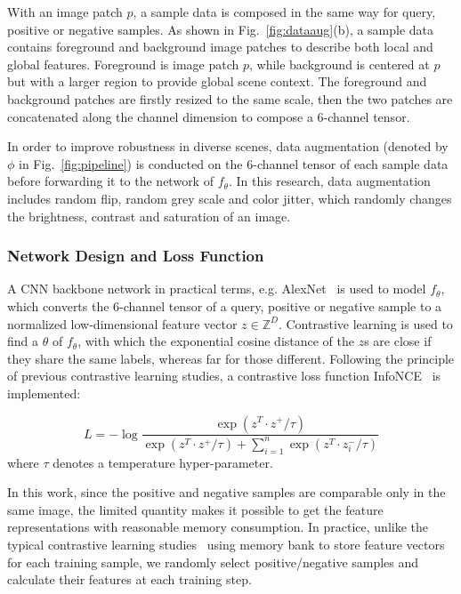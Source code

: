 \documentclass[letterpaper, 10 pt, conference]{ieeeconf}  %
\begin{document}
With an image patch $p$, a sample data is composed in the same way for query, positive or negative samples.
As shown in Fig.~\ref{fig:dataaug}(b), a sample data contains foreground and background image patches to describe both local and global features. Foreground is image patch $p$, while background is centered at $p$ but with a larger region to provide global scene context. The foreground and background patches are firstly resized to the same scale, then the two patches are concatenated along the channel dimension to compose a 6-channel tensor.

In order to improve robustness in diverse scenes, data augmentation (denoted by $\phi$ in Fig.~\ref{fig:pipeline}) is conducted on the 6-channel tensor of each sample data before forwarding it to the network of $f_{\theta}$. In this research, data augmentation includes random flip, random grey scale and color jitter, which randomly changes the brightness, contrast and saturation of an image.

\subsubsection{Network Design and Loss Function}
A CNN backbone network in practical terms, e.g. AlexNet~\cite{krizhevsky2012imagenet} is used to model $f_{\theta}$, which converts the 6-channel tensor of a query, positive or negative sample to a normalized low-dimensional feature vector $z\in \mathbb{Z}^D$.
Contrastive learning is used to find a $\theta$ of $f_{\theta}$, with which the exponential cosine distance of the $z$s are close if they share the same labels, whereas far for those different.
Following the principle of previous contrastive learning studies, a contrastive loss function InfoNCE~\cite{oord2018representation} is implemented:

\vspace{-2mm}
\begin{equation}\label{loss}
L=-\log {\dfrac{\exp (z^T \cdot z^+/\tau)}{\exp (z^T \cdot z^+/\tau)+\sum_{i=1}^{n}{\exp (z^T \cdot z_i^-/\tau)}}}
\end{equation}
where $\tau$ denotes a temperature hyper-parameter.

In this work, since the positive and negative samples are comparable only in the same image, the limited quantity makes it possible to get the feature representations with reasonable memory consumption. In practice, unlike the typical contrastive learning studies~\cite{Wu_2018_CVPR} using memory bank to store feature vectors for each training sample, we randomly select positive/negative samples and calculate their features at each training step.
\end{document}
